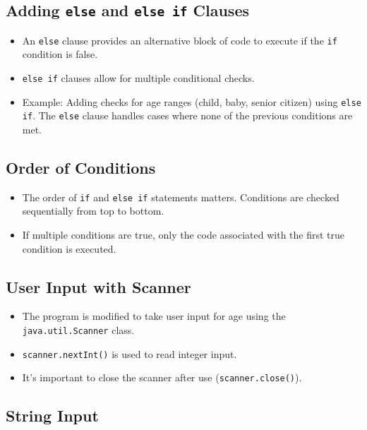 \documentclass{article}
\begin{document}
\subsection{Adding \texttt{else} and \texttt{else if} Clauses}

\begin{itemize}
    \item An \texttt{else} clause provides an alternative block of code to execute if the \texttt{if} condition is false.
    \item \texttt{else if} clauses allow for multiple conditional checks.
    \item Example:  Adding checks for age ranges (child, baby, senior citizen) using \texttt{else if}.  The \texttt{else} clause handles cases where none of the previous conditions are met.
\end{itemize}

\subsection{Order of Conditions}

\begin{itemize}
    \item The order of \texttt{if} and \texttt{else if} statements matters.  Conditions are checked sequentially from top to bottom.
    \item If multiple conditions are true, only the code associated with the first true condition is executed.
\end{itemize}

\subsection{User Input with Scanner}

\begin{itemize}
    \item The program is modified to take user input for age using the \texttt{java.util.Scanner} class.
    \item  \texttt{scanner.nextInt()} is used to read integer input.
    \item  It's important to close the scanner after use (\texttt{scanner.close()}).
\end{itemize}

\subsection{String Input}
\end{document}
